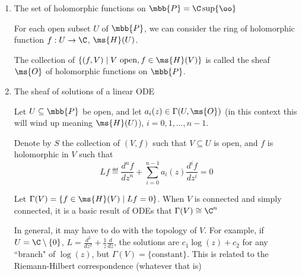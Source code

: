 \documentclass[x11names,reqno,14pt]{extarticle}
\begin{document}
\begin{enumerate}[label=(\alph*)]

\item The set of holomorphic functions on $\mbb{P} = \C \sup \{\oo\}$

For each open subset $U$ of $\mbb{P}$, we can consider the ring of holomorphic function $f:U\to\C$, $\ms{H}(U)$. 

The collection of $\{(f, V) \mid V \text{ open}, f \in \ms{H}(V) \}$ is called the sheaf $\ms{O}$ of holomorphic functions on $\mbb{P}$.

\item The sheaf of solutions of a linear ODE

Let $U \subseteq \mbb{P}$ be open, and let $a_i(z) \in \Gamma(U,\ms{O})$ (in this context this will wind up meaning $\ms{H}(U)$), $i = 0,1,\dots,n - 1$. 

Denote by $S$ the collection of $(V, f)$ such that $V \subseteq U$ is open, and $f$ is holomorphic in $V$ such that 
\[
Lf \eqdef \frac{d^nf}{dz^n} + \sum_{i=0}^{n - 1}a_i(z)\frac{d^if}{dz^i} = 0
\]

Let $\Gamma(V) = \{f \in \ms{H}(V) \mid Lf = 0 \}$. When $V$ is connected and simply connected, it is a basic result of ODEs that $\Gamma(V)\cong \C^n$

In general, it may have to do with the topology of $V$. For example, if $U = \C\setminus\{0\}$, $L = \frac{d^2}{dz^2} + \frac{1}{z}\frac{d}{dz}$, the solutions are $c_1\log(z) + c_2$ for any ``branch" of $\log(z)$, but $\Gamma(V) = \{\text{constant}\}$. This is related to the Riemann-Hilbert correspondence (whatever that is)

\end{enumerate}

\,
\end{document}
